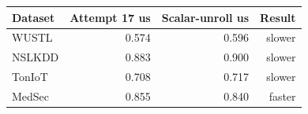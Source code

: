 \begin{tabular}{lrrr}
\toprule
Dataset & Attempt 17 us & Scalar-unroll us & Result \\
\midrule
WUSTL & 0.574 & 0.596 & slower \\
NSLKDD & 0.883 & 0.900 & slower \\
TonIoT & 0.708 & 0.717 & slower \\
MedSec & 0.855 & 0.840 & faster \\
\bottomrule
\end{tabular}
